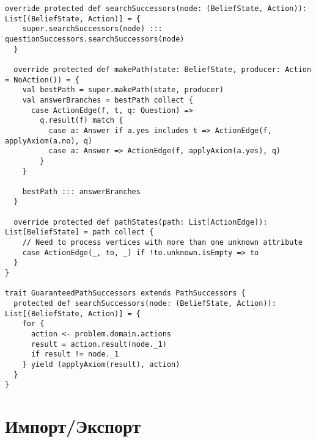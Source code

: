 \begin{lstlisting}[caption=Path Successors, label=source_pathsc]
  override protected def searchSuccessors(node: (BeliefState, Action)): List[(BeliefState, Action)] = {
    super.searchSuccessors(node) ::: questionSuccessors.searchSuccessors(node)
  }

  override protected def makePath(state: BeliefState, producer: Action = NoAction()) = {
    val bestPath = super.makePath(state, producer)
    val answerBranches = bestPath collect {
      case ActionEdge(f, t, q: Question) =>
        q.result(f) match {
          case a: Answer if a.yes includes t => ActionEdge(f, applyAxiom(a.no), q)
          case a: Answer => ActionEdge(f, applyAxiom(a.yes), q)
        }
    }

    bestPath ::: answerBranches
  }

  override protected def pathStates(path: List[ActionEdge]): List[BeliefState] = path collect {
    // Need to process vertices with more than one unknown attribute
    case ActionEdge(_, to, _) if !to.unknown.isEmpty => to
  }
}

trait GuaranteedPathSuccessors extends PathSuccessors {
  protected def searchSuccessors(node: (BeliefState, Action)): List[(BeliefState, Action)] = {
    for {
      action <- problem.domain.actions
      result = action.result(node._1)
      if result != node._1
    } yield (applyAxiom(result), action)
  }
}
\end{lstlisting}

\section*{Импорт/Экспорт}

